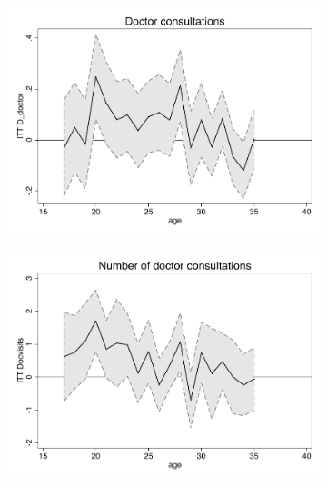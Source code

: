 \documentclass[a4paper ]{article}
\begin{document}
\begin{figure}[p]
\begin{subfigure}[h]{0.48\textwidth}\centering
	\includegraphics[width=\textwidth]{../../analysis/graphs/SOEP/D_doctor_LC.pdf}
\end{subfigure}
\quad
\begin{subfigure}[h]{0.48\textwidth}\centering
	\includegraphics[width=\textwidth]{../../analysis/graphs/SOEP/Docvisits_LC.pdf}
\end{subfigure}




\end{figure}
\end{document}
